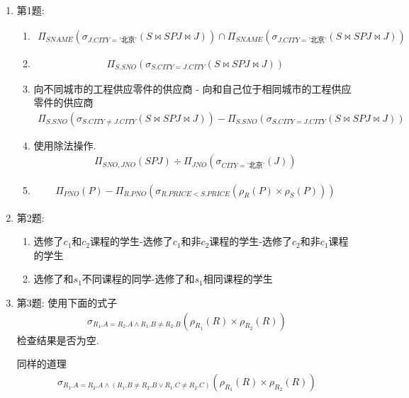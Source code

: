 \begin{solution}
\begin{enumerate}
    \item 第1题:
    \begin{enumerate}
        \item \begin{align*}
            \Pi_{SNAME}(\sigma_{J.CITY=\text{'北京'}}(S \bowtie SPJ \bowtie J)) \cap \Pi_{SNAME}(\sigma_{J.CITY=\text{'北京'}}(S \bowtie SPJ \bowtie J))
        \end{align*}
        \item \begin{align*}
            \Pi_{S.SNO}(\sigma_{S.CITY=J.CITY}(S \bowtie SPJ \bowtie J))
        \end{align*}
        \item 向不同城市的工程供应零件的供应商 - 向和自己位于相同城市的工程供应零件的供应商
        \begin{align*}
            \Pi_{S.SNO}(\sigma_{S.CITY\neq J.CITY}(S \bowtie SPJ \bowtie J)) - \Pi_{S.SNO}(\sigma_{S.CITY=J.CITY}(S \bowtie SPJ \bowtie J))
        \end{align*}
        \item 使用除法操作.
        \begin{align*}
            \Pi_{SNO,JNO}(SPJ) \div \Pi_{JNO}(\sigma_{CITY=\text{'北京'}}(J))
        \end{align*}
        \item \begin{align*}
            \Pi_{PNO}(P) - \Pi_{R.PNO}(\sigma_{R.PRICE<S.PRICE}(\rho_R(P)\times \rho_S(P)))
        \end{align*}
    \end{enumerate}
    \item 第2题:
    \begin{enumerate}
        \item 选修了$c_1$和$c_2$课程的学生-选修了$c_1$和非$c_2$课程的学生-选修了$c_2$和非$c_1$课程的学生
        \item 选修了和$s_1$不同课程的同学-选修了和$s_1$相同课程的学生
    \end{enumerate}
    \item 第3题: 使用下面的式子
    \begin{align*}
        \sigma_{R_1.A=R_2.A \land R_1.B \neq R_2.B}(\rho_{R_1}(R) \times \rho_{R_2}(R))
    \end{align*}
    检查结果是否为空.

    同样的道理
    \begin{align*}
        \sigma_{R_1.A=R_2.A \land (R_1.B \neq R_2.B \lor R_1.C \neq R_2.C)}(\rho_{R_1}(R) \times \rho_{R_2}(R))
    \end{align*}
\end{enumerate}
\end{solution}
